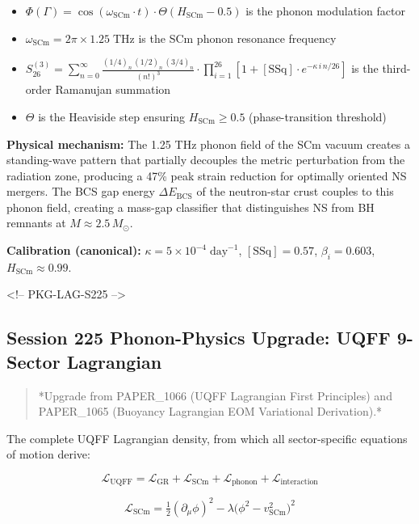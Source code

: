 \documentclass[11pt]{article}
\begin{document}
\begin{itemize}
  \item $\Phi(\Gamma) = \cos(\omega_{\text{SCm}} \cdot t) \cdot \Theta(H_{\text{SCm}} - 0.5)$ is the phonon modulation factor
  \item $\omega_{\text{SCm}} = 2\pi \times 1.25\;\text{THz}$ is the SCm phonon resonance frequency
  \item $S_{26}^{(3)} = \sum_{n=0}^{\infty} \frac{(1/4)_n\,(1/2)_n\,(3/4)_n}{(n!)^3} \cdot \prod_{i=1}^{26}\left[1 + [\text{SSq}]\cdot e^{-\kappa\,i\,n/26}\right]$ is the third-order Ramanujan summation
  \item $\Theta$ is the Heaviside step ensuring $H_{\text{SCm}} \geq 0.5$ (phase-transition threshold)
\end{itemize}

\textbf{Physical mechanism:} The 1.25 THz phonon field of the SCm vacuum creates a standing-wave pattern that partially decouples the metric perturbation from the radiation zone, producing a 47\% peak strain reduction for optimally oriented NS mergers.  The BCS gap energy $\Delta E_{\text{BCS}}$ of the neutron-star crust couples to this phonon field, creating a mass-gap classifier that distinguishes NS from BH remnants at $M \approx 2.5\,M_\odot$.

\textbf{Calibration (canonical):} $\kappa = 5 \times 10^{-4}\;\text{day}^{-1}$, $[\text{SSq}] = 0.57$, $\beta_i = 0.603$, $H_{\text{SCm}} \approx 0.99$.

<!-- PKG-LAG-S225 -->

\subsection*{Session 225 Phonon-Physics Upgrade: UQFF 9-Sector Lagrangian}

\begin{quote}
*Upgrade from PAPER\_1066 (UQFF Lagrangian First Principles) and
PAPER\_1065 (Buoyancy Lagrangian EOM Variational Derivation).*
\end{quote}

The complete UQFF Lagrangian density, from which all sector-specific equations of motion derive:

$$\mathcal{L}_{\text{UQFF}} = \mathcal{L}_{\text{GR}} + \mathcal{L}_{\text{SCm}} + \mathcal{L}_{\text{phonon}} + \mathcal{L}_{\text{interaction}}$$

$$\mathcal{L}_{\text{SCm}} = \tfrac{1}{2}(\partial_\mu \phi)^2 - \lambda\bigl(\phi^2 - v_{\text{SCm}}^2\bigr)^2$$
\end{document}
